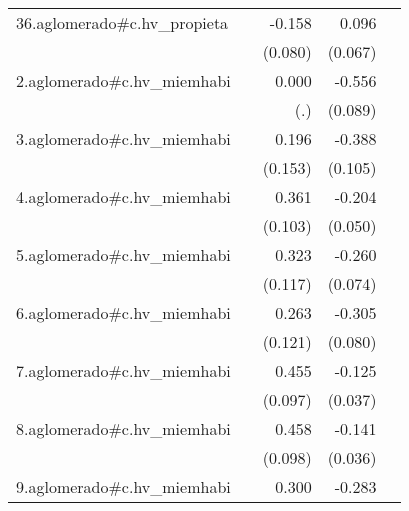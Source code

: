 {\begin{longtable}{l*{4}{D{.}{.}{-1}}}
\addlinespace
36.aglomerado#c.hv\_propieta&                     &      -0.158\sym{*}  &       0.096         &                     \\
            &                     &     (0.080)         &     (0.067)         &                     \\
\addlinespace
2.aglomerado#c.hv\_miemhabi&                     &       0.000         &      -0.556\sym{***}&                     \\
            &                     &         (.)         &     (0.089)         &                     \\
\addlinespace
3.aglomerado#c.hv\_miemhabi&                     &       0.196         &      -0.388\sym{***}&                     \\
            &                     &     (0.153)         &     (0.105)         &                     \\
\addlinespace
4.aglomerado#c.hv\_miemhabi&                     &       0.361\sym{***}&      -0.204\sym{***}&                     \\
            &                     &     (0.103)         &     (0.050)         &                     \\
\addlinespace
5.aglomerado#c.hv\_miemhabi&                     &       0.323\sym{**} &      -0.260\sym{***}&                     \\
            &                     &     (0.117)         &     (0.074)         &                     \\
\addlinespace
6.aglomerado#c.hv\_miemhabi&                     &       0.263\sym{*}  &      -0.305\sym{***}&                     \\
            &                     &     (0.121)         &     (0.080)         &                     \\
\addlinespace
7.aglomerado#c.hv\_miemhabi&                     &       0.455\sym{***}&      -0.125\sym{***}&                     \\
            &                     &     (0.097)         &     (0.037)         &                     \\
\addlinespace
8.aglomerado#c.hv\_miemhabi&                     &       0.458\sym{***}&      -0.141\sym{***}&                     \\
            &                     &     (0.098)         &     (0.036)         &                     \\
\addlinespace
9.aglomerado#c.hv\_miemhabi&                     &       0.300\sym{**} &      -0.283\sym{***}&                     \\

\end{longtable}}
